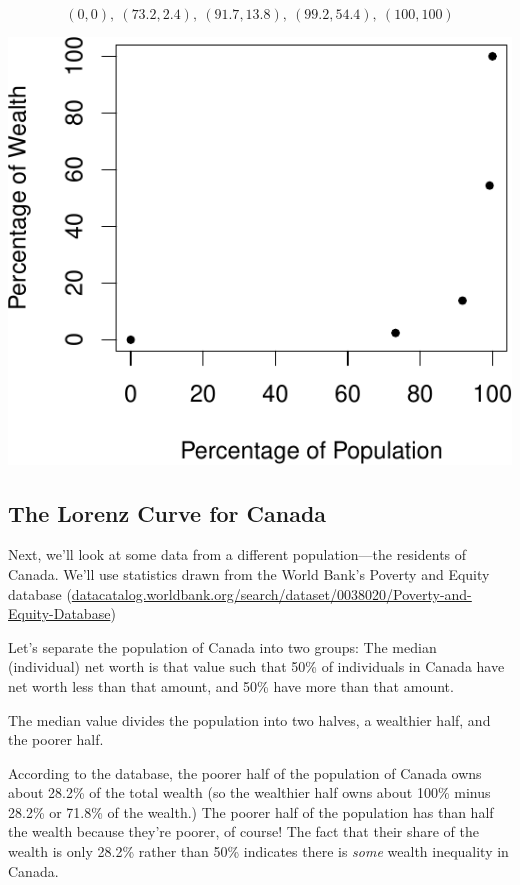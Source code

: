 \documentclass[12pt]{memoir}\usepackage[]{graphicx}\usepackage[table]{xcolor}
\begin{document}
$$(0, 0),\ (73.2, 2.4),\ (91.7, 13.8),\ (99.2, 54.4),\ (100, 100)$$


\begin{center}
\includegraphics{figure/plota-1.pdf}
\end{center}

\subsection*{The Lorenz Curve for Canada}

Next, we'll look at some data from a different population---the residents of Canada.
We'll use statistics drawn from the World Bank's Poverty and Equity database 
({\scriptsize \url{datacatalog.worldbank.org/search/dataset/0038020/Poverty-and-Equity-Database}})

Let's separate the population of Canada into two groups:  The median (individual)
net worth is that value such that 50\% of individuals in Canada have net worth 
less than that amount, and 50\% have more than that amount. 

The median value divides the population into two halves, a wealthier half, and 
the poorer half. 

According to the database, the poorer half of the population of Canada owns
about 28.2\% of the total wealth (so the wealthier half owns about 100\% minus
28.2\% or 71.8\% of the wealth.)  The poorer half of the population has than 
half the wealth because they're poorer, of course!  The fact that their share
of the wealth is only 28.2\% rather than 50\% indicates there is \emph{some}
wealth inequality in Canada.
\end{document}
